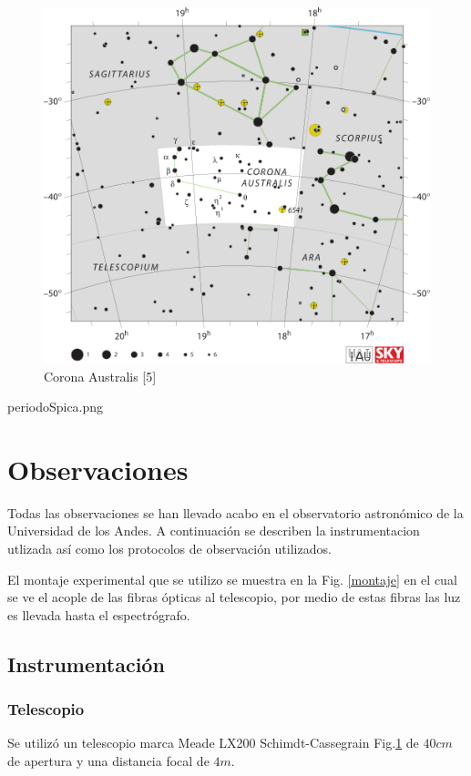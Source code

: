 \documentclass[Proceedings]{ascelike}
\begin{document}
\begin{figure}
\centering
\includegraphics[scale=0.4]{CRA.png}
\caption{Corona Australis [5]\label{la}}
\end{figure}periodoSpica.png


\section{Observaciones}

Todas las observaciones se han llevado acabo en el observatorio astron\'omico de la 
Universidad de los Andes. A continuaci\'on se describen la instrumentacion utlizada
as\'i como los protocolos de observaci\'on utilizados.

El montaje experimental que se utilizo se muestra en la Fig. \ref{montaje} en el cual se ve el acople
de las fibras \'opticas al telescopio, por medio de estas fibras las luz es llevada hasta
el espectr\'ografo.

\subsection{Instrumentaci\'on}

\subsubsection{Telescopio}

Se utiliz\'o un telescopio marca Meade LX200 Schimdt-Cassegrain Fig.\ref{la} de $40 cm$ de apertura y una distancia focal de $4m$.
\end{document}
